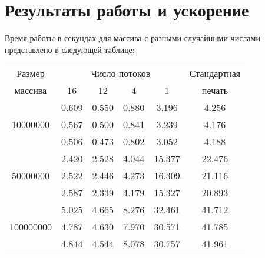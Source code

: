\documentclass[a4paper, 12pt, twoside]{article}
\begin{document}
\section{Результаты работы и ускорение}
Время работы в секундах для массива с разными случайными числами представлено в следующей таблице:
\begin{center}
\begin{tabular}{||c|c|c|c|c|c||}
\hline
\hline
Размер & \multicolumn{4}{c|}{Число потоков} & Стандартная\\
\hhline{~|-|-|-|-|~|}
массива & 16 & 12 & 4 & 1 & печать \\
\hline
\hline
& 0.609 & 0.550 & 0.880 & 3.196 & 4.256 \\
\hhline{~|-|-|-|-|-|}
10000000 & 0.567 & 0.500 & 0.841 & 3.239 & 4.176 \\
\hhline{~|-|-|-|-|-|}
& 0.506 &0.473 & 0.802 & 3.052 & 4.188 \\
\hline
& 2.420 & 2.528 & 4.044 & 15.377 & 22.476 \\
\hhline{~|-|-|-|-|-|}
50000000 & 2.522 & 2.446 & 4.273 & 16.309 & 21.116\\
\hhline{~|-|-|-|-|-|}
& 2.587 & 2.339 & 4.179 & 15.327 & 20.893 \\
\hline
& 5.025 & 4.665 & 8.276 & 32.461 & 41.712 \\
\hhline{~|-|-|-|-|-|}
100000000 & 4.787 & 4.630 & 7.970 & 30.571 & 41.785 \\
\hhline{~|-|-|-|-|-|}
& 4.844 & 4.544 & 8.078 & 30.757 & 41.961 \\
\hline
\hline
\end{tabular}
\end{center}
\end{document}
